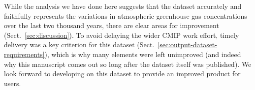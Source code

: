 While the analysis we have done here suggests that the dataset
accurately and faithfully represents the variations in atmospheric greenhouse gas concentrations
over the last two thousand years, there are clear areas for improvement (Sect.~\ref{sec:discussion}).
To avoid delaying the wider CMIP work effort,
timely delivery was a key criterion for this dataset (Sect.~\ref{sec:output-dataset-requirements}),
which is why many elements were left unimproved
(and indeed why this manuscript comes out so long after the dataset itself was published).
We look forward to developing on this dataset to provide an improved product for users.
